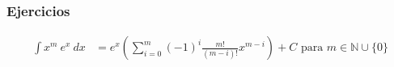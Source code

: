 \subsubsection{Ejercicios}
\begin{align}
	\int x^m\:e^x\:dx&=e^x\left(\sum_{i=0}^m (-1)^i\frac{m!}{(m-i)!}x^{m-i}\right)+C\text{ para }m\in \mathbb N\cup\{0\}\label{ej:3.3.1}
\end{align}